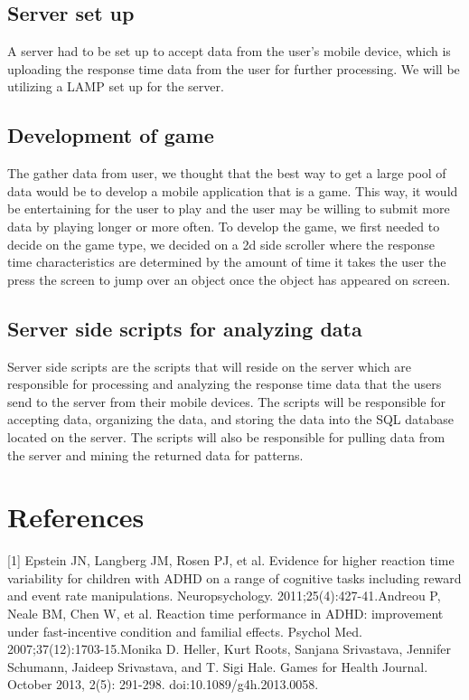 \documentclass[a4wide]{article}
\begin{document}
\subsection{Server set up}
\- A server had to be set up to accept data from the user's mobile device, which is uploading the response time data from the user for further processing. We will be utilizing a LAMP set up for the server.
\subsection{Development of game}
\- The gather data from user, we thought that the best way to get a large pool of data would be to develop a mobile application that is a game. This way, it would be entertaining for the user to play and the user may be willing to submit more data by playing longer or more often. To develop the game, we first needed to decide on the game type, we decided on a 2d side scroller where the response time characteristics are determined by the amount of time it takes the user the press the screen to jump over an object once the object has appeared on screen. 
\subsection{Server side scripts for analyzing data}
\- Server side scripts are the scripts that will reside on the server which are responsible for processing and analyzing the response time data that the users send to the server from their mobile devices. The scripts will be responsible for accepting data, organizing the data, and storing the data into the SQL database located on the server. The scripts will also be responsible for pulling data from the server and mining the returned data for patterns.  

\section{References}
[1] Epstein JN, Langberg JM, Rosen PJ, et al. Evidence for higher reaction time variability for children with ADHD on a range of cognitive tasks including reward and event rate manipulations. Neuropsychology. 2011;25(4):427-41.\newline
[2] Andreou P, Neale BM, Chen W, et al. Reaction time performance in ADHD: improvement under fast-incentive condition and familial effects. Psychol Med. 2007;37(12):1703-15.\newline
[3] Monika D. Heller, Kurt Roots, Sanjana Srivastava, Jennifer Schumann, Jaideep Srivastava, and T. Sigi Hale. Games for Health Journal. October 2013, 2(5): 291-298. doi:10.1089/g4h.2013.0058.\newline
\end{document}
